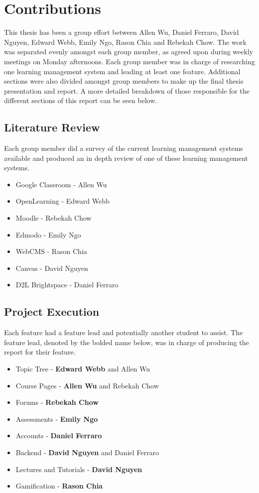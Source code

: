 \chapter*{Contributions}

This thesis has been a group effort between Allen Wu, Daniel Ferraro, David Nguyen, Edward Webb, Emily Ngo, Rason Chia and Rebekah Chow.
The work was separated evenly amongst each group member, as agreed upon during weekly meetings on Monday afternoons.
Each group member was in charge of researching one learning management system and leading at least one feature.
Additional sections were also divided amongst group members to make up the final thesis presentation and report.
A more detailed breakdown of those responsible for the different sections of this report can be seen below.

\section{Literature Review}
Each group member did a survey of the current learning management systems available and produced an in depth review of one of these learning management systems.

\begin{itemize}
    \item Google Classroom - Allen Wu
    \item OpenLearning - Edward Webb
    \item Moodle - Rebekah Chow
    \item Edmodo - Emily Ngo
    \item WebCMS - Rason Chia
    \item Canvas - David Nguyen
    \item D2L Brightspace - Daniel Ferraro
\end{itemize}

\section{Project Execution}
Each feature had a feature lead and potentially another student to assist.
The feature lead, denoted by the bolded name below, was in charge of producing the report for their feature.

\begin{itemize}
    \item Topic Tree - \textbf{Edward Webb} and Allen Wu
    \item Course Pages - \textbf{Allen Wu} and Rebekah Chow
    \item Forums - \textbf{Rebekah Chow}
    \item Assessments - \textbf{Emily Ngo}
    \item Accounts - \textbf{Daniel Ferraro}
    \item Backend - \textbf{David Nguyen} and Daniel Ferraro
    \item Lectures and Tutorials - \textbf{David Nguyen}
    \item Gamification - \textbf{Rason Chia}
\end{itemize}

